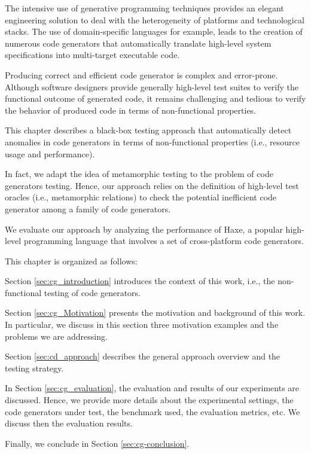 
The intensive use of generative programming techniques provides an elegant engineering solution to deal with the heterogeneity of platforms and technological stacks. The use of domain-specific languages for example, leads to the creation of numerous code generators that automatically translate high-level system specifications into multi-target executable code. 

Producing correct and efficient code generator is complex and error-prone. Although software designers provide generally high-level test suites to verify the functional outcome of generated code, it remains challenging and tedious to verify the behavior of produced code in terms of non-functional properties.

This chapter describes a black-box testing approach that automatically detect anomalies in code generators in terms of non-functional properties (i.e., resource usage and performance).
 
In fact, we adapt the idea of metamorphic testing to the problem of code generators testing.  Hence, our approach relies on the definition of high-level test oracles (i.e., metamorphic relations) to check the potential inefficient code generator among a family of code generators. 

We evaluate our approach by analyzing the performance of Haxe, a popular high-level programming language that involves a set of cross-platform code generators. 

This chapter is organized as follows: 

Section \ref{sec:cg_introduction} introduces the context of this work, i.e., the non-functional testing of code generators.

Section \ref{sec:cg_Motivation} presents the motivation and background of this work. In particular, we discuss in this section three motivation examples and the problems we are addressing.

Section \ref{sec:cd_approach} describes the general approach overview and the testing strategy.

In Section \ref{sec:cg_evaluation}, the evaluation and results of our experiments are discussed. Hence, we provide more details about the experimental settings, the code generators under test, the benchmark used, the evaluation metrics, etc. We discuss then the evaluation results.

Finally, we conclude in Section \ref{sec:cg-conclusion}. 


